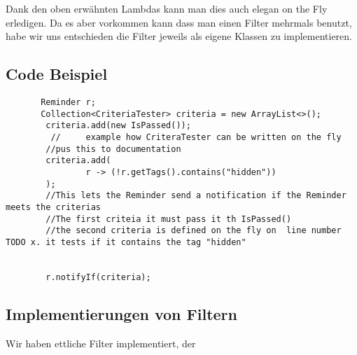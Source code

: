   Dank den oben erwähnten Lambdas kann man dies auch elegan on the Fly erledigen. Da es aber vorkommen kann dass man einen Filter mehrmals benutzt, habe wir uns entschieden die Filter jeweils als eigene Klassen zu implementieren.
  \subsection{Code Beispiel}
  
       \begin{lstlisting}
       Reminder r;
       Collection<CriteriaTester> criteria = new ArrayList<>();
        criteria.add(new IsPassed());
         //     example how CriteraTester can be written on the fly
        //pus this to documentation
        criteria.add(
                r -> (!r.getTags().contains("hidden"))
        );
        //This lets the Reminder send a notification if the Reminder meets the criterias 
        //The first criteia it must pass it th IsPassed()
        //the second criteria is defined on the fly on  line number TODO x. it tests if it contains the tag "hidden"
        
     
        r.notifyIf(criteria);

       \end{lstlisting}
       
       
       \subsection{Implementierungen von Filtern}
       Wir haben ettliche Filter implementiert, der 
       